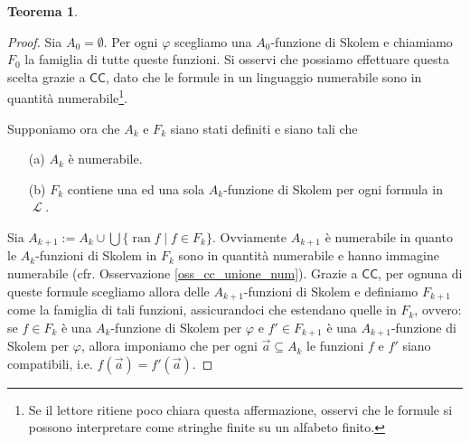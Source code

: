 \documentclass[12pt,a4paper]{report}
\theoremstyle{definition}
\newtheorem{teo}{Teorema}[section]  %
\theoremstyle{num.custom-title}
\DeclareMathOperator{\ran}{ran}
\DeclareMathOperator{\LL}{\mathcal{L}}
\DeclareMathOperator{\sse}{\subseteq}
\newcommand{\CC}{\ensuremath{\mathsf{CC}}\xspace}
\renewcommand{\phi}{\varphi}
\begin{document}
\begin{teo}
\begin{proof}
Sia $A_0= \emptyset$. Per ogni $\phi$ scegliamo una $A_0$-funzione di Skolem e chiamiamo $F_0$ la famiglia di tutte queste funzioni. Si osservi che possiamo effettuare questa scelta grazie a \CC, dato che le formule in un linguaggio numerabile sono in quantità numerabile\footnote{Se il lettore ritiene poco chiara questa affermazione, osservi che le formule si possono interpretare come stringhe finite su un alfabeto finito.}. 

Supponiamo ora che $A_k$ e $F_k$ siano stati definiti e siano tali che
\begin{itemize}
\item[(a)] $A_k$ è numerabile.
\item[(b)] $F_k$ contiene una ed una sola $A_k$-funzione di Skolem per ogni formula in $\LL$.
\end{itemize}
Sia $A_{k+1} := A_k \cup \bigcup \{\ran f \mid f \in F_k\}$. Ovviamente $A_{k+1}$ è numerabile in quanto le $A_k$-funzioni di Skolem in $F_k$ sono in quantità numerabile e hanno immagine numerabile (cfr. Osservazione \ref{oss_cc_unione_num}). Grazie a \CC, per ognuna di queste formule scegliamo allora delle $A_{k+1}$-funzioni di Skolem e definiamo $F_{k+1}$ come la famiglia di tali funzioni, assicurandoci che estendano quelle in $F_k$, ovvero: se $f \in F_k$ è una $A_k$-funzione di Skolem per $\phi$ e $f' \in F_{k+1}$ è una $A_{k+1}$-funzione di Skolem per $\phi$, allora imponiamo che per ogni $\vec a \sse A_k$ le funzioni $f$ e $f'$ siano compatibili, i.e. $f(\vec a)=f'(\vec a)$.


\end{proof}
\end{teo}
\end{document}
